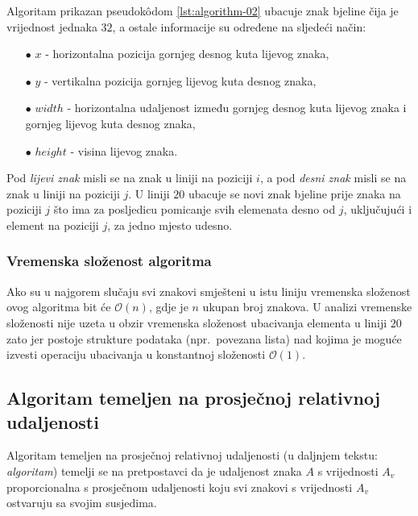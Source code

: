\documentclass[times, utf8, zavrsni]{fer}
\begin{document}
\pagebreak

Algoritam prikazan pseudokôdom \ref{lst:algorithm-02} ubacuje znak bjeline
čija je vrijednost jednaka $32$, a ostale informacije su određene na sljedeći
način:
\begin{itemize}
    \item[$\bullet$] $x$ - horizontalna pozicija gornjeg desnog kuta lijevog
                           znaka,
    \item[$\bullet$] $y$ - vertikalna pozicija gornjeg lijevog kuta desnog
                           znaka,
    \item[$\bullet$] $width$ - horizontalna udaljenost između gornjeg desnog
                               kuta lijevog znaka i gornjeg lijevog kuta desnog
                               znaka,
    \item[$\bullet$] $height$ - visina lijevog znaka.
\end{itemize}

Pod \emph{lijevi znak} misli se na znak u liniji na poziciji $i$, a pod
\emph{desni znak} misli se na znak u liniji na poziciji $j$. U liniji $20$
ubacuje se novi znak bjeline prije znaka na poziciji $j$ što
ima za posljedicu pomicanje svih elemenata desno od $j$, uključujući i element
na poziciji $j$, za jedno mjesto udesno.


\subsubsection{Vremenska složenost algoritma}
Ako su u najgorem slučaju svi znakovi smješteni u istu liniju vremenska
složenost ovog algoritma bit će $\mathcal{O}(n)$, gdje je $n$ ukupan broj
znakova. U analizi vremenske složenosti nije uzeta u obzir vremenska složenost
ubacivanja elementa u liniji $20$ zato jer postoje
strukture podataka (npr.\ povezana lista) nad kojima je moguće izvesti operaciju
ubacivanja u konstantnoj složenosti $\mathcal{O}(1)$.

\pagebreak







\subsection{Algoritam temeljen na prosječnoj relativnoj udaljenosti}
\label{subsec:algoritam-temeljen-na-prosjecnoj-relativnoj-udaljenosti}
Algoritam temeljen na prosječnoj relativnoj udaljenosti (u daljnjem tekstu:
\emph{algoritam}) temelji se na pretpostavci da je udaljenost znaka $A$ s
vrijednosti  $A_v$ proporcionalna s prosječnom udaljenosti koju svi
znakovi s vrijednosti $A_v$ ostvaruju sa svojim susjedima.
\end{document}
